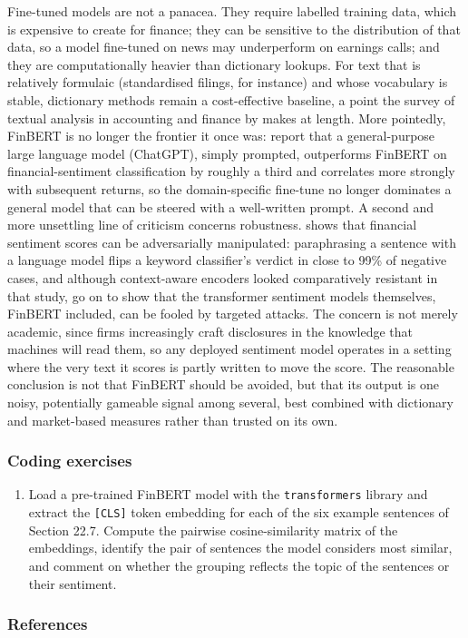 Fine-tuned models are not a panacea. They require labelled training data, which is expensive to create for finance; they can be sensitive to the distribution of that data, so a model fine-tuned on news may underperform on earnings calls; and they are computationally heavier than dictionary lookups. For text that is relatively formulaic (standardised filings, for instance) and whose vocabulary is stable, dictionary methods remain a cost-effective baseline, a point the survey of textual analysis in accounting and finance by \cite{loughran2016textual} makes at length. More pointedly, FinBERT is no longer the frontier it once was: \cite{fatouros2023chatgpt} report that a general-purpose large language model (ChatGPT), simply prompted, outperforms FinBERT on financial-sentiment classification by roughly a third and correlates more strongly with subsequent returns, so the domain-specific fine-tune no longer dominates a general model that can be steered with a well-written prompt. A second and more unsettling line of criticism concerns robustness. \cite{leippold2023sentiment} shows that financial sentiment scores can be adversarially manipulated: paraphrasing a sentence with a language model flips a keyword classifier's verdict in close to 99\% of negative cases, and although context-aware encoders looked comparatively resistant in that study, \cite{turetken2026battle} go on to show that the transformer sentiment models themselves, FinBERT included, can be fooled by targeted attacks. The concern is not merely academic, since firms increasingly craft disclosures in the knowledge that machines will read them, so any deployed sentiment model operates in a setting where the very text it scores is partly written to move the score. The reasonable conclusion is not that FinBERT should be avoided, but that its output is one noisy, potentially gameable signal among several, best combined with dictionary and market-based measures rather than trusted on its own.

\subsubsection{Coding exercises}

\begin{enumerate}
\item Load a pre-trained FinBERT model with the \texttt{transformers} library and extract the
\texttt{[CLS]} token embedding for each of the six example sentences of Section 22.7.
Compute the pairwise cosine-similarity matrix of the embeddings, identify the pair
of sentences the model considers most similar, and comment on whether the grouping
reflects the topic of the sentences or their sentiment.
\end{enumerate}

\subsubsection{References}
